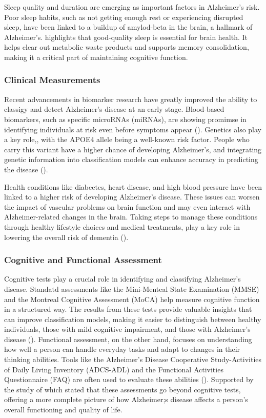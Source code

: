 \documentclass[12pt]{article}
\begin{document}
Sleep quality and duration are emerging as important factors in Alzheimer's risk. Poor sleep habits, such as not getting enough rest or experiencing disrupted sleep, have been linked to a buildup of amylod-beta in the brain, a hallmark of Alzheimer's. \cite{Dominguez2021} highlights
that good-quality sleep is essential for brain health. It helps clear out metabolic waste products and supports memory consolidation, making it a critical part of maintaining cognitive function.

\subsubsection{Clinical Measurements}
\noindent

Recent advancements in biomarker research have greatly improved the ability to classigy and detect Alzheimer's disease at an early stage. Blood-based biomarkers, such as specific microRNAs (miRNAs), are showing promimse in identifying individuals at risk even before symptoms appear 
(\cite{JAMA2019}). Genetics also play a key role,, with the APOE4 allele being a well-known risk factor. People who carry this variant have a higher chance of developing Alzheimer's, and integrating genetic information into classification models can enhance accuracy in predicting the
disease (\cite{JAMA2019}).

Health conditions like diabeetes, heart disease, and high blood pressure have been linked to a higher risk of developing Alzheimer's disease. These issues can worsen the impact of vascular problems on brain function and may even interact with Alzheimer-related changes in the brain. Taking
steps to manage these conditions through healthy lifestyle choices and medical treatments, play a key role in lowering the overall risk of dementia (\cite{PMC2021}).

\subsubsection{Cognitive and Functional Assessment}
\noindent

Cognitive tests play a crucial role in identifying and classifying Alzheimer's disease. Standatd assessments like the Mini-Menteal State Examination (MMSE) and the Montreal Cognitive Assessment (MoCA) help measure cognitive function in a structured way. The results from these tests provide 
valuable insights that can improve classification models, making it easier to distinguish between healthy individuals, those with mild cognitive impairment, and those with Alzheimer's disease (\cite{PMC2021}). Functional assessment, on the other hand, focuses on understanding how well a person
can handle everyday tasks and adapt to changes in their thinking abilities. Tools like the Alzheimer's Disease Cooperative Study-Activities of Daily Living Inventory (ADCS-ADL) and the Functional Activities Questionnaire (FAQ) are often used to evaluate these abilities (\cite{Custodio2022}). Supported by
the study of \cite{Cummings2017} which stated that these assessments go beyond cognitive tests, offering a more complete picture of how Alzheimer;s disease affects a person's overall functioning and quality of life.
\end{document}
